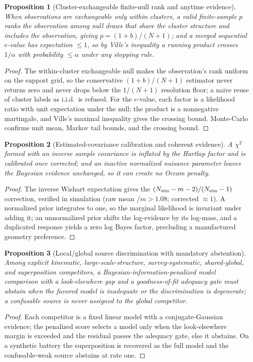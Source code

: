 \documentclass[11pt]{article}
\newtheorem{proposition}{Proposition}
\begin{document}
\begin{proposition}[Cluster-exchangeable finite-null rank and anytime evidence]
\label{prop:cluster}
When observations are exchangeable only within clusters, a valid finite-sample
$p$ ranks the observation among null draws that share the cluster structure and
includes the observation, giving $p=(1+b)/(N+1)$; and a merged sequential
$e$-value has expectation $\le1$, so by Ville's inequality a running product
crosses $1/\alpha$ with probability $\le\alpha$ under any stopping rule.
\end{proposition}
\begin{proof}
The within-cluster exchangeable null makes the observation's rank uniform on the
support grid, so the conservative $(1+b)/(N+1)$ estimator never returns zero and
never drops below the $1/(N+1)$ resolution floor; a naive reuse of cluster labels
as i.i.d.\ is refused. For the $e$-value, each factor is a likelihood ratio with
unit expectation under the null; the product is a nonnegative martingale, and
Ville's maximal inequality gives the crossing bound. Monte-Carlo confirms unit
mean, Markov tail bounds, and the crossing bound.
\end{proof}

\begin{proposition}[Estimated-covariance calibration and coherent evidence]
\label{prop:estcov}
A $\chi^2$ formed with an inverse sample covariance is inflated by the
Hartlap factor and is calibrated once corrected; and an inactive normalized
nuisance parameter leaves the Bayesian evidence unchanged, so it can create no
Occam penalty.
\end{proposition}
\begin{proof}
The inverse Wishart expectation gives the $(N_{\rm sim}-m-2)/(N_{\rm sim}-1)$
correction, verified in simulation (raw mean $/m>1.08$; corrected $\approx1$). A
normalized prior integrates to one, so the marginal likelihood is invariant under
adding it; an unnormalized prior shifts the log-evidence by its log-mass, and a
duplicated response yields a zero log Bayes factor, precluding a manufactured
geometry preference.
\end{proof}

\begin{proposition}[Local/global source discrimination with mandatory abstention]
\label{prop:discrim}
Among explicit kinematic, large-scale-structure, survey-systematic, shared-global,
and superposition competitors, a Bayesian-information-penalized model comparison
with a look-elsewhere gap and a goodness-of-fit adequacy gate must abstain when
the favored model is inadequate or the discrimination is degenerate; a confusable
source is never assigned to the global competitor.
\end{proposition}
\begin{proof}
Each competitor is a fixed linear model with a conjugate-Gaussian evidence; the
penalized score selects a model only when the look-elsewhere margin is exceeded
and the residual passes the adequacy gate, else it abstains. On a synthetic
battery the superposition is recovered as the full model and the confusable-weak
source abstains at rate one.
\end{proof}
\end{document}
